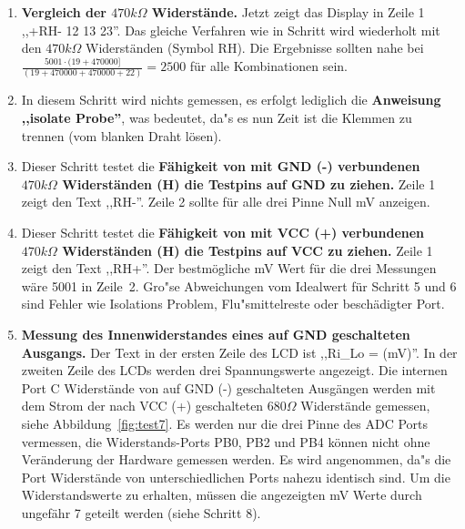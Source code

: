 \begin{enumerate}
\item {\bf Vergleich der \(470k\Omega\) Widerst\"ande.}
Jetzt zeigt das Display in Zeile 1 ,,+RH- 12 13 23''. Das gleiche Verfahren wie in Schritt wird wiederholt mit den
 \(470k\Omega\) Widerst\"anden (Symbol RH).
Die Ergebnisse sollten nahe bei \(\frac{5001 \cdot (19 + 470000]}{ (19 + 470000 + 470000 + 22)} = 2500\) f\"ur alle Kombinationen sein.
\item In diesem Schritt wird nichts gemessen, es erfolgt lediglich die {\bf Anweisung ,,isolate Probe''},
was bedeutet, da"s es nun Zeit ist die Klemmen zu trennen (vom blanken Draht l\"osen).
\item Dieser Schritt testet die {\bf F\"ahigkeit von mit GND (-) verbundenen \(470k\Omega\) Widerst\"anden (H) die Testpins auf GND zu ziehen.}
Zeile 1 zeigt den Text ,,RH-''.
Zeile 2 sollte f\"ur alle drei Pinne  Null mV anzeigen.
\item Dieser Schritt testet die {\bf F\"ahigkeit von mit VCC (+) verbundenen \(470k\Omega\) Widerst\"anden (H) die Testpins auf VCC zu ziehen.}
Zeile 1 zeigt den Text ,,RH+''.
Der bestm\"ogliche mV Wert f\"ur die drei Messungen w\"are 5001 in Zeile~2.
 Gro"se Abweichungen vom Idealwert f\"ur Schritt 5 und 6 sind Fehler wie Isolations Problem, Flu"smittelreste oder besch\"adigter Port.
\item {\bf Messung des Innenwiderstandes eines auf GND geschalteten Ausgangs.}
Der Text in der ersten Zeile des LCD ist ,,Ri\_Lo = (mV)''.
In der zweiten Zeile des LCDs werden drei Spannungswerte angezeigt.
Die internen Port C Widerst\"ande von auf GND (-) geschalteten Ausg\"angen werden mit dem Strom
der nach VCC (+) geschalteten \(680\Omega\) Widerst\"ande gemessen, siehe Abbildung~\ref{fig:test7}.
Es werden nur die drei Pinne des ADC Ports vermessen, die Widerstands-Ports  PB0, PB2 und PB4 k\"onnen nicht
ohne Ver\"anderung der Hardware gemessen werden.
Es wird angenommen, da"s die Port Widerst\"ande von unterschiedlichen Ports nahezu identisch sind.
Um die Widerstandswerte zu erhalten, m\"ussen die angezeigten mV Werte durch ungef\"ahr 7 geteilt werden (siehe Schritt 8).
\begin{figure}[H]
\centering

\end{figure}
\end{enumerate}
